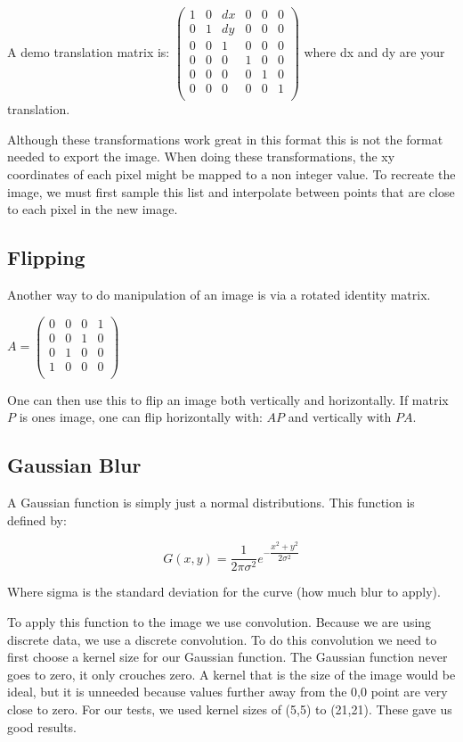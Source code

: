 \documentclass[11pt]{article}
\begin{document}
A demo translation matrix is:
  $\begin{pmatrix}
	1 & 0 & dx & 0 & 0 & 0\\
	0 & 1 & dy & 0 & 0 & 0\\
	0 & 0 & 1 & 0 & 0 & 0\\
	0 & 0 & 0 & 1 & 0 & 0\\
	0 & 0 & 0 & 0 & 1 & 0\\
	0 & 0 & 0 & 0 & 0 & 1\\
\end{pmatrix}$
where dx and dy are your translation.

Although these transformations work great in this format this is not the format needed to export the image. When doing these transformations, the xy coordinates of each pixel might be mapped to a non integer value. To recreate the image, we must first sample this list and interpolate between points that are close to each pixel in the new image.


\subsection{Flipping}
Another way to do manipulation of an image is via a rotated identity matrix. 

$A = \begin{pmatrix}
	0 & 0 & 0 & 1\\
	0 & 0 & 1 & 0\\
	0 & 1 & 0 & 0\\
	1 & 0 & 0 & 0\\
\end{pmatrix}$

One can then use this to flip an image both vertically and horizontally.
If matrix $P$ is ones image, one can flip horizontally with:
$A P$ and vertically with $P A$. 


\subsection{Gaussian Blur}
A Gaussian function is simply just a normal distributions. This function is defined by:

$$
G(x,y) = \dfrac{1}{2\pi \sigma^2}e^{-\dfrac{x^2+y^2}{2 \sigma^2}}$$

Where sigma is the standard deviation for the curve (how much blur to apply). 

To apply this function to the image we use convolution. Because we are using discrete data, we use a discrete convolution. To do this convolution we need to first choose a kernel size for our Gaussian function. The Gaussian function never goes to zero, it only crouches zero. A kernel that is the size of the image would be ideal, but it is unneeded because values further away from the 0,0 point are very close to zero. For our tests, we used kernel sizes of (5,5) to (21,21). These gave us good results. 
\end{document}
